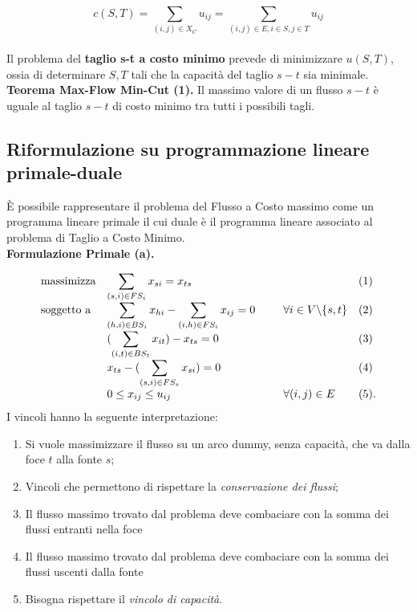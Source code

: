 \documentclass{article}
\begin{document}
\[c(S,T) = \sum_{(i, j) \in X_{C}} u_{ij} = \sum_{(i,j) \in E, i \in S, j \in T} u_{ij} \]\\
Il problema del \textbf{taglio s-t a costo minimo} prevede di minimizzare $u(S,T)$, ossia di determinare $S, T$ tali che la capacità del taglio $s-t$ sia minimale.\\

\textbf{Teorema Max-Flow Min-Cut (1).} Il massimo valore di un flusso $s-t$ è uguale al taglio $s-t$ di costo minimo tra tutti i possibili tagli.
\pagebreak

\subsection{Riformulazione su programmazione lineare primale-duale}

È possibile rappresentare il problema del Flusso a Costo massimo come un programma lineare primale il cui duale è il programma lineare associato al problema di Taglio a 
Costo Minimo.\\


\textbf{Formulazione Primale (a).}

\begin{equation*}
    \begin{array}{ll@{}ll}
    \text{massimizza}   & \displaystyle\sum_{(s, i) \in FS_{i}} x_{si} = x_{ts} & \;\;\;\;\;\;\;\;\; &(1)\\
    \text{soggetto a}   & \displaystyle\sum_{(h, i) \in BS_{i}} x_{hi} - \sum_{(i, h) \in FS_{i}} x_{ij} = 0 \;\;\;\;\;\;\;\;\; &    \forall i \in V \backslash \{s,t\}&(2)\\
                        & (\displaystyle\sum_{(i, t) \in BS_{t}} x_{it}) - x_{ts} = 0 & &(3)\\
                        &  x_{ts} - (\displaystyle\sum_{(s,i) \in FS_{s}} x_{si}) = 0 & &(4)\\
                        &0 \leq x_{ij} \leq u_{ij} & \forall (i,j) \in E &(5).
    \end{array}
    \end{equation*}
I vincoli hanno la seguente interpretazione:
\begin{enumerate}
    \item Si vuole massimizzare il flusso su un arco dummy, senza capacità, che va dalla foce $t$ alla fonte $s$;
    \item Vincoli che permettono di rispettare la \emph{conservazione dei flussi};
    \item Il flusso massimo trovato dal problema deve combaciare con la somma dei flussi entranti nella foce
    \item Il flusso massimo trovato dal problema deve combaciare con la somma dei flussi uscenti dalla fonte
    \item Bisogna rispettare il \emph{vincolo di capacità}.
\end{enumerate}
\end{document}

